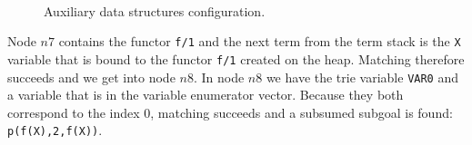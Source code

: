 \begin{figure}
   \centering
   \qquad
    \\

   \caption{Auxiliary data structures configuration.}
   \label{fig:data_structs}
\end{figure}

Node $n7$ contains the functor \texttt{f/1} and the next term from the term stack is the
\texttt{X} variable that is bound to the functor \texttt{f/1} created on the heap. Matching
therefore succeeds and we get into node $n8$. In node $n8$ we have the trie variable \texttt{VAR0}
and a variable that is in the variable enumerator vector. Because they both correspond to the index 0,
matching succeeds and a subsumed subgoal is found: \texttt{p(f(X),2,f(X))}.

